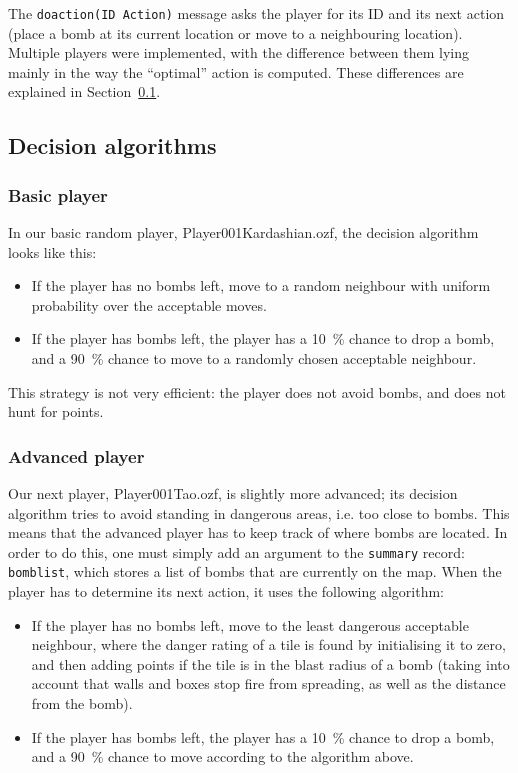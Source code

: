 \documentclass[12pt,journal]{IEEEtran}
\newcommand{\ntt}{\normalfont\ttfamily}
\newcommand{\fn}[1]{{\protect\ntt#1}}
\begin{document}
The \lstinline|doaction(ID Action)| message asks the player for its ID and its next action (place a bomb at its current location or move to a neighbouring location).
Multiple players were implemented, with the difference between them lying mainly in the way the ``optimal'' action is computed.
These differences are explained in Section~\ref{sec:playerai}.

\subsection{Decision algorithms}
\label{sec:playerai}
\subsubsection{Basic player}
In our basic random player, \fn{Player001Kardashian.ozf}, the decision algorithm looks like this:
\begin{itemize}
	\item If the player has no bombs left, move to a random neighbour with uniform probability over the acceptable moves.
	\item If the player has bombs left, the player has a \SI{10}{\percent} chance to drop a bomb, and a \SI{90}{\percent} chance to move to a randomly chosen acceptable neighbour.
\end{itemize}

This strategy is not very efficient: the player does not avoid bombs, and does not hunt for points.

\subsubsection{Advanced player}
Our next player, \fn{Player001Tao.ozf}, is slightly more advanced; its decision algorithm tries to avoid standing in dangerous areas, i.e. too close to bombs.
This means that the advanced player has to keep track of where bombs are located.
In order to do this, one must simply add an argument to the \lstinline|summary| record: \lstinline|bomblist|, which stores a list of bombs that are currently on the map.
When the player has to determine its next action, it uses the following algorithm:
\begin{itemize}
	\item If the player has no bombs left, move to the least dangerous acceptable neighbour, where the danger rating of a tile is found by initialising it to zero, and then adding points if the tile is in the blast radius of a bomb (taking into account that walls and boxes stop fire from spreading, as well as the distance from the bomb).
	\item If the player has bombs left, the player has a \SI{10}{\percent} chance to drop a bomb, and a \SI{90}{\percent} chance to move according to the algorithm above.
\end{itemize}
\end{document}
